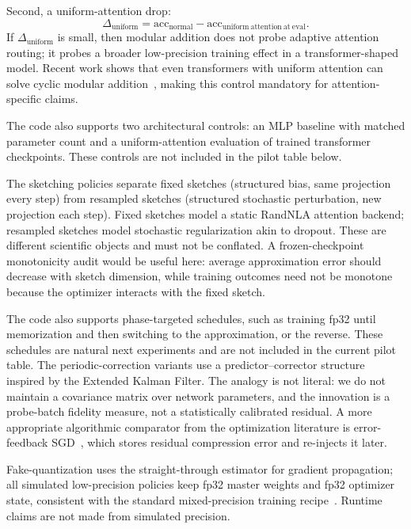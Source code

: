 Second, a uniform-attention drop:
\[
    \Delta_{\mathrm{uniform}}
    =
    \mathrm{acc}_{\mathrm{normal}}
    -
    \mathrm{acc}_{\mathrm{uniform\ attention\ at\ eval}}.
\]
If $\Delta_{\mathrm{uniform}}$ is small, then modular addition does not probe adaptive attention routing; it probes a broader low-precision training effect in a transformer-shaped model. Recent work shows that even transformers with uniform attention can solve cyclic modular addition~\autocite{GeometricInductiveBiasGrokking2026}, making this control mandatory for attention-specific claims.

The code also supports two architectural controls: an MLP baseline with matched parameter count and a uniform-attention evaluation of trained transformer checkpoints. These controls are not included in the pilot table below.

The sketching policies separate fixed sketches (structured bias, same projection every step) from resampled sketches (structured stochastic perturbation, new projection each step). Fixed sketches model a static RandNLA attention backend; resampled sketches model stochastic regularization akin to dropout. These are different scientific objects and must not be conflated. A frozen-checkpoint monotonicity audit would be useful here: average approximation error should decrease with sketch dimension, while training outcomes need not be monotone because the optimizer interacts with the fixed sketch.

The code also supports phase-targeted schedules, such as training fp32 until memorization and then switching to the approximation, or the reverse. These schedules are natural next experiments and are not included in the current pilot table. The periodic-correction variants use a predictor--corrector structure inspired by the Extended Kalman Filter. The analogy is not literal: we do not maintain a covariance matrix over network parameters, and the innovation is a probe-batch fidelity measure, not a statistically calibrated residual. A more appropriate algorithmic comparator from the optimization literature is error-feedback SGD~\autocite{Stich2019, Alistarh2017}, which stores residual compression error and re-injects it later.

Fake-quantization uses the straight-through estimator for gradient propagation; all simulated low-precision policies keep fp32 master weights and fp32 optimizer state, consistent with the standard mixed-precision training recipe~\autocite{MicikeviciusEtAl2018}. Runtime claims are not made from simulated precision.

